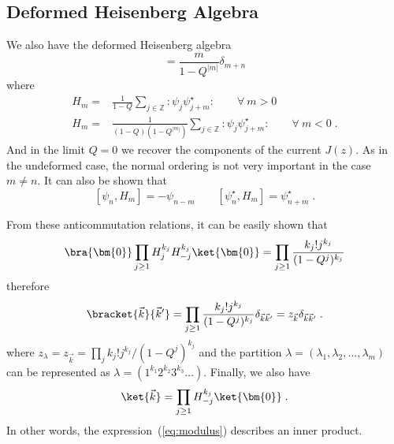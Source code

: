 
\subsection{Deformed Heisenberg Algebra}

We also have the deformed Heisenberg algebra
\begin{equation}
[H_m, H_n] = \frac{m}{1-Q^{|m|}}\delta_{m+n}
\end{equation}
where
\begin{equation}
\begin{split}
  H_m = & \frac{1}{1-Q}\sum_{j\in \mathbb{Z}} :\psi_j\psi^\star_{j+m}:\qquad \forall\ m>0\\
  H_m = & \frac{1}{(1-Q)(1-Q^{|m|})}\sum_{j\in \mathbb{Z}} :\psi_j\psi^\star_{j+m}:\qquad \forall\ m<0\; .
\end{split}
\end{equation}
And in the limit \(Q=0\) we recover the components of the current
\(J(z)\).  As in the undeformed case, the normal ordering is not very
important in the case \(m\neq n\). It can also be shown that
\begin{equation}
\label{eq:hpsi}
[\psi_n, H_m] = - \psi_{n -m}\qquad 
[\psi^\star_n, H_m] = \psi^\star_{n + m}\; .
\end{equation}

From these anticommutation relations, it can be easily shown that
\begin{equation}
  \label{eq:modulus}
   \bra{\bm{0}} \prod_{j\geq 1} H_{j}^{k_j} H_{-j}^{k_j}\ket{\bm{0}}
    = \prod_{j\geq 1} \frac{ k_j! j^{k_j}}{(1 - Q^j)^{k_j}}
\end{equation}
therefore
\begin{equation}
    \bracket{\vec{k}}{\vec{k}'}
    = \prod_{j\geq 1} \frac{ k_j! j^{k_j}}{(1 - Q^j)^{k_j}} \delta_{\vec{k}\vec{k}'}
    = z_{\vec{k}} \delta_{\vec{k}\vec{k}'}\; .
\end{equation}
where \(z_{\lambda} = z_{\vec{k}} = \prod_j k_j! j^{k_j}/(1 -
Q^j)^{k_j}\) and the partition \(\lambda = (\lambda_1, \lambda_2,
\dots, \lambda_m)\) can be represented as \(\lambda = (1^{k_1}
2^{k_2} 3^{k_3}\dots)\). Finally, we also have
\begin{equation}
\ket{\vec{k}} = \prod_{j\geq 1} H_{-j}^{k_j}\ket{\bm{0}}\; . 
\end{equation}
In other words, the expression~(\ref{eq:modulus}) describes an inner product. 

